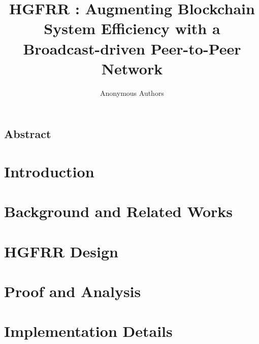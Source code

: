 \documentclass[letterpaper,twocolumn,10pt]{article}
\newcommand{\xxx}{\textsc{HGFRR }}
\begin{document}
\date{}

\title{\Large \bf \xxx: Augmenting Blockchain System Efficiency with a Broadcast-driven Peer-to-Peer Network}


\author{
{\rm Anonymous Authors}\\
}

\maketitle

\thispagestyle{empty}

\subsection*{Abstract}


\section{Introduction}


\section{Background and Related Works} \label{background}


\section{HGFRR Design} \label{design}


\section{Proof and Analysis} \label{analysis}


\section{Implementation Details} \label{implementation}

\end{document}
